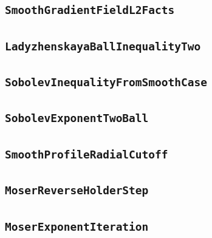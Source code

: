 \documentclass[11pt]{amsart}
\theoremstyle{definition}
\begin{document}
\subsection{\texorpdfstring{\texttt{SmoothGradientFieldL2Facts}}{SmoothGradientFieldL2Facts}}\label{node:SmoothGradientFieldL2Facts}


\subsection{\texorpdfstring{\texttt{LadyzhenskayaBallInequalityTwo}}{LadyzhenskayaBallInequalityTwo}}\label{node:LadyzhenskayaBallInequalityTwo}


\subsection{\texorpdfstring{\texttt{SobolevInequalityFromSmoothCase}}{SobolevInequalityFromSmoothCase}}\label{node:SobolevInequalityFromSmoothCase}


\subsection{\texorpdfstring{\texttt{SobolevExponentTwoBall}}{SobolevExponentTwoBall}}\label{node:SobolevExponentTwoBall}


\subsection{\texorpdfstring{\texttt{SmoothProfileRadialCutoff}}{SmoothProfileRadialCutoff}}\label{node:SmoothProfileRadialCutoff}


\subsection{\texorpdfstring{\texttt{MoserReverseHolderStep}}{MoserReverseHolderStep}}\label{node:MoserReverseHolderStep}


\subsection{\texorpdfstring{\texttt{MoserExponentIteration}}{MoserExponentIteration}}\label{node:MoserExponentIteration}

\end{document}
